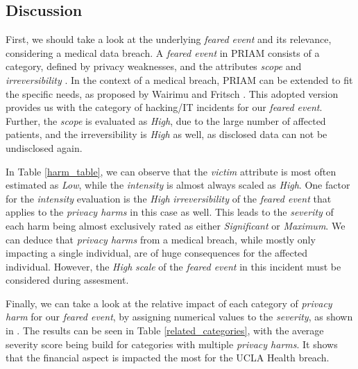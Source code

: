 \subsection{Discussion}
First, we should take a look at the underlying \textit{feared event} and its relevance, considering a medical data breach. A \textit{feared event} in PRIAM consists of a category, defined by privacy weaknesses, and the attributes \textit{scope} and \textit{irreversibility} \cite[Section 3.6]{de:hal-01302541}. In the context of a medical breach, PRIAM can be extended to fit the specific needs, as proposed by Wairimu and Fritsch \cite{wairimu2022modelling}. This adopted version provides us with the category of hacking/IT incidents for our \textit{feared event}. Further, the \textit{scope} is evaluated as \textit{High}, due to the large number of affected patients, and the irreversibility is \textit{High} as well, as disclosed data can not be undisclosed again.
 
In Table \ref{harm_table}, we can observe that the \textit{victim} attribute is most often estimated as \textit{Low}, while the \textit{intensity} is almost always scaled as \textit{High}. One factor for the \textit{intensity} evaluation is the \textit{High} \textit{irreversibility} of the \textit{feared event} that applies to the \textit{privacy harms} in this case as well. This leads to the \textit{severity} of each harm being almost exclusively rated as either \textit{Significant} or \textit{Maximum}. We can deduce that \textit{privacy harms} from a medical breach, while mostly only impacting a single individual, are of huge consequences for the affected individual. However, the \textit{High} \textit{scale} of the \textit{feared event} in this incident must be considered during assesment. 

Finally, we can take a look at the relative impact of each category of \textit{privacy harm} for our \textit{feared event}, by assigning numerical values to the \textit{severity}, as shown in \cite{wairimu2022modelling}. The results can be seen in Table \ref{related_categories}, with the average severity score being build for categories with multiple \textit{privacy harms}. It shows that the financial aspect is impacted the most for the UCLA Health breach.  

\begin{table}[h!]
    \centering
\noindent{}
    \caption{Relative impact of categories of privacy harms in the UCLA Health breach}
    \label{related_categories}
\end{table}
